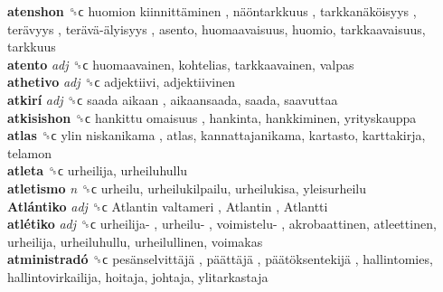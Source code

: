 \textbf{atenshon} ␝ϲ   huomion kiinnittäminen ,  näöntarkkuus ,  tarkkanäköisyys ,  terävyys ,  terävä-älyisyys , asento, huomaavaisuus, huomio, tarkkaavaisuus, tarkkuus  \\
\textbf{atento} \emph{adj}  ␝ϲ  huomaavainen, kohtelias, tarkkaavainen, valpas  \\
\textbf{athetivo} \emph{adj}  ␝ϲ  adjektiivi, adjektiivinen  \\
\textbf{atkirí} \emph{adj}  ␝ϲ   saada aikaan , aikaansaada, saada, saavuttaa  \\
\textbf{atkisishon} ␝ϲ   hankittu omaisuus , hankinta, hankkiminen, yrityskauppa  \\
\textbf{atlas} ␝ϲ   ylin niskanikama , atlas, kannattajanikama, kartasto, karttakirja, telamon  \\
\textbf{atleta} ␝ϲ  urheilija, urheiluhullu  \\
\textbf{atletismo} \emph{n}  ␝ϲ  urheilu, urheilukilpailu, urheilukisa, yleisurheilu  \\
\textbf{Atlántiko} \emph{adj}  ␝ϲ   Atlantin valtameri ,  Atlantin ,  Atlantti   \\
\textbf{atlétiko} \emph{adj}  ␝ϲ   urheilija- ,  urheilu- ,  voimistelu- , akrobaattinen, atleettinen, urheilija, urheiluhullu, urheilullinen, voimakas  \\
\textbf{atministradó} ␝ϲ   pesänselvittäjä ,  päättäjä ,  päätöksentekijä , hallintomies, hallintovirkailija, hoitaja, johtaja, ylitarkastaja  \\
